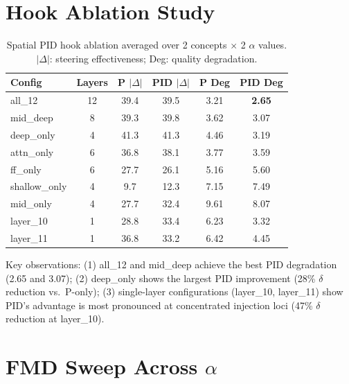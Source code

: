 \documentclass{article}
\theoremstyle{plain}
\begin{document}
\section{Hook Ablation Study}
\label{app:hook_ablation}

\begin{table}[h]
  \caption{Spatial PID hook ablation averaged over 2 concepts $\times$ 2 $\alpha$ values. $|\Delta|$: steering effectiveness; Deg: quality degradation.}
  \label{tab:hook_ablation}
  \begin{center}
  \begin{small}
  \begin{tabular}{lccccc}
    \toprule
    Config & Layers & P $|\Delta|$ & PID $|\Delta|$ & P Deg & PID Deg \\
    \midrule
    all\_12 & 12 & 39.4 & 39.5 & 3.21 & \textbf{2.65} \\
    mid\_deep & 8 & 39.3 & 39.8 & 3.62 & 3.07 \\
    deep\_only & 4 & 41.3 & 41.3 & 4.46 & 3.19 \\
    attn\_only & 6 & 36.8 & 38.1 & 3.77 & 3.59 \\
    ff\_only & 6 & 27.7 & 26.1 & 5.16 & 5.60 \\
    shallow\_only & 4 & 9.7 & 12.3 & 7.15 & 7.49 \\
    mid\_only & 4 & 27.7 & 32.4 & 9.61 & 8.07 \\
    layer\_10 & 1 & 28.8 & 33.4 & 6.23 & 3.32 \\
    layer\_11 & 1 & 36.8 & 33.2 & 6.42 & 4.45 \\
    \bottomrule
  \end{tabular}
  \end{small}
  \end{center}
\end{table}

Key observations: (1) all\_12 and mid\_deep achieve the best PID degradation (2.65 and 3.07); (2) deep\_only shows the largest PID improvement (28\% $\delta$ reduction vs.\ P-only); (3) single-layer configurations (layer\_10, layer\_11) show PID's advantage is most pronounced at concentrated injection loci (47\% $\delta$ reduction at layer\_10).

\section{FMD Sweep Across $\alpha$}
\label{app:fmd_sweep}
\end{document}
